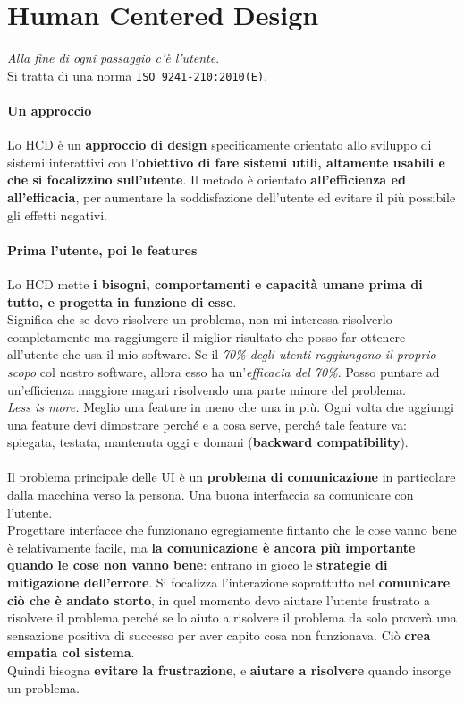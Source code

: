 \documentclass[10pt]{article}
\begin{document}
\section{Human Centered Design}
\textit{Alla fine di ogni passaggio c'è l'utente}.\\Si tratta di una norma \texttt{ISO 9241-210:2010(E)}.
\paragraph{Un approccio} Lo HCD è un \textbf{approccio di design} specificamente orientato allo sviluppo di sistemi interattivi con l'\textbf{obiettivo di fare sistemi utili, altamente usabili e che si focalizzino sull'utente}. Il metodo è orientato \textbf{all'efficienza ed all'efficacia}, per aumentare la soddisfazione dell'utente ed evitare il più possibile gli effetti negativi.\\
\paragraph{Prima l'utente, poi le features} Lo HCD mette \textbf{i bisogni, comportamenti e capacità umane prima di tutto, e progetta in funzione di esse}.\\
Significa che se devo risolvere un problema, non mi interessa risolverlo completamente ma raggiungere il miglior risultato che posso far ottenere all'utente che usa il mio software. Se il \textit{70\% degli utenti raggiungono il proprio scopo} col nostro software, allora esso ha un'\textit{efficacia del 70\%}. Posso puntare ad un'efficienza maggiore magari risolvendo una parte minore del problema.\\
\textit{Less is more.} Meglio una feature in meno che una in più. Ogni volta che aggiungi una feature devi dimostrare perché e a cosa serve, perché tale feature va: spiegata, testata, mantenuta oggi e domani (\textbf{backward compatibility}).\\\\
Il problema principale delle UI è un \textbf{problema di comunicazione} in particolare dalla macchina verso la persona. Una buona interfaccia sa comunicare con l'utente.\\
Progettare interfacce che funzionano egregiamente fintanto che le cose vanno bene è relativamente facile, ma \textbf{la comunicazione è ancora più importante quando le cose non vanno bene}: entrano in gioco le \textbf{strategie di mitigazione dell'errore}. Si focalizza l'interazione soprattutto nel \textbf{comunicare ciò che è andato storto}, in quel momento devo aiutare l'utente frustrato a risolvere il problema perché se lo aiuto a risolvere il problema da solo proverà una sensazione positiva di successo per aver capito cosa non funzionava. Ciò \textbf{crea empatia col sistema}.\\Quindi bisogna \textbf{evitare la frustrazione}, e \textbf{aiutare a risolvere} quando insorge un problema.
\end{document}
